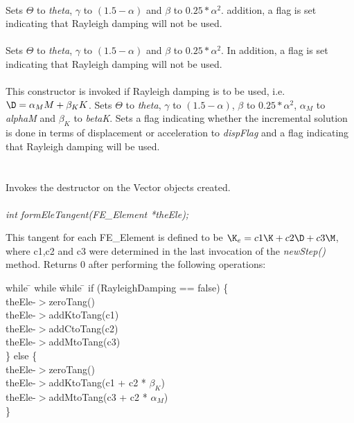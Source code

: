 \\ 
Sets $\Theta$ to {\em theta}, $\gamma$ to $(1.5 - \alpha)$ and $\beta$
to $0.25*\alpha^2$. addition, a flag is set indicating that Rayleigh
damping will not be used. \\ 

\\ 
Sets $\Theta$ to {\em theta}, $\gamma$ to $(1.5 - \alpha)$ and $\beta$
to $0.25*\alpha^2$. In addition, a flag is set indicating that Rayleigh
damping will not be used. \\

\\ 
This constructor is invoked if Rayleigh damping is to be used, 
i.e. $\D = \alpha_M M + \beta_K K$. Sets $\Theta$ to {\em theta},
$\gamma$ to $(1.5 - \alpha)$, $\beta$ to $0.25*\alpha^2$, $\alpha_M$ to
{\em alphaM} and $\beta_K$ to {\em betaK}. Sets a flag indicating whether the
incremental solution is done in terms of displacement or acceleration
to {\em dispFlag} and a flag indicating that Rayleigh damping will 
be used. \\ 


 \\
\\ 
Invokes the destructor on the Vector objects created. \\

\\
{\em int formEleTangent(FE\_Element *theEle);} 

This tangent for each FE\_Element is defined to be $\K_e = c1 \K
+ c2  \D + c3 \M$, where c1,c2 and c3 were determined in the last invocation
of the {\em newStep()} method. Returns $0$ after performing the
following operations:  
\begin{tabbing}
while \= \+ while \= while \= \kill
if (RayleighDamping == false) \{ \+ \\
theEle-$>$zeroTang() \\
theEle-$>$addKtoTang(c1) \\
theEle-$>$addCtoTang(c2) \\
theEle-$>$addMtoTang(c3)  \- \\
\} else \{ \+ \\
theEle-$>$zeroTang() \\
theEle-$>$addKtoTang(c1 + c2 * $\beta_K$) \\
theEle-$>$addMtoTang(c3 + c2 * $\alpha_M$)  \- \\ 
\}
\end{tabbing}

